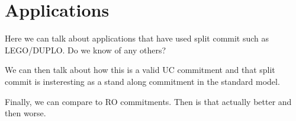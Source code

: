 \section{Applications}

Here we can talk about applications that have used split commit such as LEGO/DUPLO. Do we know of any others?


We can then talk about how this is a valid UC commitment and that split commit is insteresting as a stand along commitment in the standard model.

Finally, we can compare to RO commitments. Then is that actually better and then worse.
